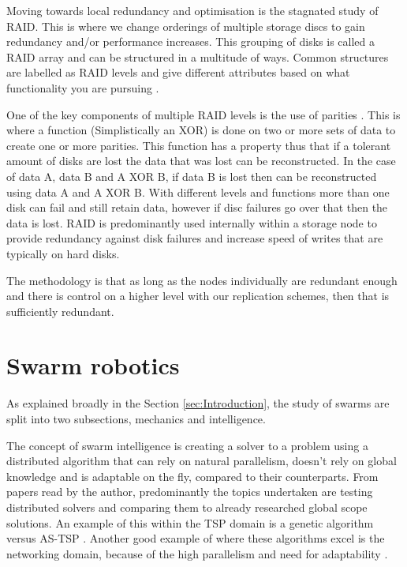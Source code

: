 \documentclass{UoYCSproject}
\begin{document}
Moving towards local redundancy and optimisation is the stagnated study of RAID.
This is where we change orderings of multiple storage discs to gain redundancy and/or performance increases.
This grouping of disks is called a RAID array and can be structured in a multitude of ways.
Common structures are labelled as RAID levels and give different attributes based on what functionality you are pursuing \cite{RAID Levels}.

One of the key components of multiple RAID levels is the use of parities \cite{Raid parity}.
This is where a function (Simplistically an XOR) is done on two or more sets of data to create one or more parities.
This function has a property thus that if a tolerant amount of disks are lost the data that was lost can be reconstructed.
In the case of data A, data B and A XOR B, if data B is lost then can be reconstructed using data A and A XOR B.
With different levels and functions more than one disk can fail and still retain data, however if disc failures go over that then the data is lost.
RAID is predominantly used internally within a storage node to provide redundancy against disk failures and increase speed of writes that are typically on hard disks.

The methodology is that as long as the nodes individually are redundant enough and there is control on a higher level with our replication schemes, then that is sufficiently redundant.



\section{Swarm robotics}
\label{sec:Robotics}

As explained broadly in the Section \ref{sec:Introduction}, the study of swarms are split into two subsections, mechanics and intelligence.

The concept of swarm intelligence is creating a solver to a problem using a distributed algorithm that can rely on natural parallelism, doesn't rely on global knowledge and is adaptable on the fly, compared to their counterparts.
From papers read by the author, predominantly the topics undertaken are testing distributed solvers and comparing them to already researched global scope solutions.
An example of this within the TSP domain is a genetic algorithm versus AS-TSP \cite{Swarm intellegiegence}.
Another good example of where these algorithms excel is the networking domain, because of the high parallelism and need for adaptability \cite{Swarm intellegiegence}.
\end{document}
